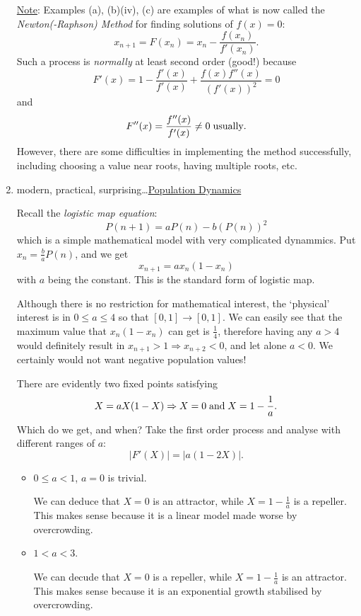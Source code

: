 \documentclass[12pt]{report}
\theoremstyle{definition}
\begin{document}
\begin{ex}
\begin{enumerate}[label = (\alph*)]
\underline{Note}: Examples (a), (b)(iv), (c) are examples of what is now called %
the \emph{Newton(-Raphson) Method} for finding solutions of $f(x) = 0$: \[%
    x_{n + 1} = F(x_n) = x_n - \frac{f(x_n)}{f'(x_n)}.
\]
Such a process is \emph{normally} at least second order (good!) because \[
    F'(x) = 1 - \frac{f'(x)}{f'(x)} + \frac{f(x)f''(x)}{{(f'(x))}^{2}} = 0
\]and\[
F''(x) = \frac{f''(x)}{f'(x)} \neq 0 \;\textnormal{usually}.
\]
However, there are some difficulties in implementing the method successfully,
including choosing a value near roots, having multiple roots, etc.
    
\item modern, practical, surprising\ldots \underline{Population Dynamics}

    Recall the \emph{logistic map equation}:\[
        P(n + 1) = aP(n) - b{(P(n))}^{2}
    \]
    which is a simple mathematical model with very complicated dynammics.
    Put $x_n = \frac{b}{a}P(n)$, and we get\[
        x_{n + 1} = ax_n(1 - x_n)
    \]
    with $a$ being the constant. This is the standard form of logistic map.

    Although there is no restriction for mathematical interest,
    the `physical' interest is in $0 \le a \le 4$ so that $[0, 1] \rightarrow{} [0, 1]$.
    We can easily see that the maximum value that $x_n (1 - x_n)$ can get is $\frac{1}{4}$,
    therefore having any $a > 4$ would definitely result in $x_{n + 1} > 1 \Rightarrow{}
    x_{n + 2} < 0$, and let alone $a < 0$.
    We certainly would not want negative population values!

    There are evidently two fixed points satisfying\[
        X = aX(1 - X) \Rightarrow{} X = 0 \;\textnormal{and}\; X = 1 - \frac{1}{a}.
    \]
    Which do we get, and when?
    Take the first order process and analyse with different ranges of $a$:\[
        |F'(X)| = |a(1 - 2X)|.
    \]
    \begin{itemize}
        \item $0 \le a < 1$, $a = 0$ is trivial.

            We can deduce that $X = 0$ is an attractor,
            while $X = 1 - \frac{1}{a}$ is a repeller.
            This makes sense because it is a linear model made worse by overcrowding.

        \item $1 < a < 3$.

            We can decude that $X= 0$ is a repeller,
            while $X = 1 - \frac{1}{a}$ is an attractor.
            This makes sense because it is an exponential growth stabilised by overcrowding.


\end{itemize}
\end{enumerate}
\end{ex}
\end{document}
